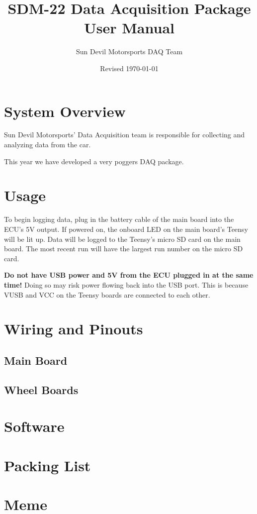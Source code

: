 \documentclass[12pt]{article}
\title{SDM-22 Data Acquisition Package\\User Manual}
\author{Sun Devil Motorsports DAQ Team}
\date{Revised \today}
\begin{document}
\maketitle
\tableofcontents
\section{System Overview}
Sun Devil Motorsports' Data Acquisition team is responsible for collecting and analyzing data from the car.

This year we have developed a very poggers DAQ package.
\pagebreak
\section{Usage}
To begin logging data, plug in the battery cable of the main board into the ECU's 5V output.
If powered on, the onboard LED on the main board's Teensy will be lit up.
Data will be logged to the Teensy's micro SD card on the main board.
The most recent run will have the largest run number on the micro SD card.

\textbf{Do not have USB power and 5V from the ECU plugged in at the same time!}
Doing so may risk power flowing back into the USB port.
This is because VUSB and VCC on the Teensy boards are connected to each other.
\section{Wiring and Pinouts}
\subsection{Main Board}
\subsection{Wheel Boards}
\section{Software}
\section{Packing List}
\section{Meme}
\end{document}
